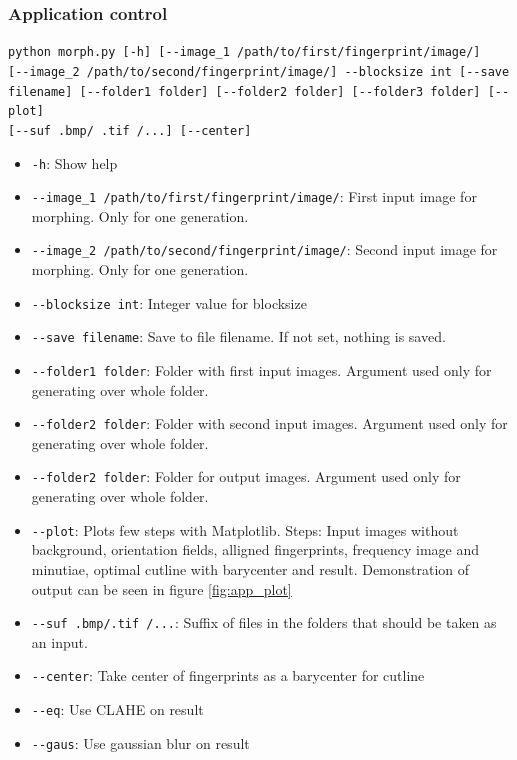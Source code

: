 \subsubsection{Application control}
\texttt{python morph.py [-h] [-{}-image\_1 /path/to/first/fingerprint/image/]} \\ \texttt{[-{}-image\_2 /path/to/second/fingerprint/image/] -{}-blocksize int [-{}-save \\ filename] [-{}-folder1 folder] [-{}-folder2 folder] [-{}-folder3 folder] [-{}-plot]} \\ \texttt{[-{}-suf .bmp/ .tif /...] [-{}-center]}

\begin{itemize}
    \item \texttt{-h}: Show help 
    \item \texttt{-{}-image\_1 /path/to/first/fingerprint/image/}: First input image for morphing. Only for one generation.
    \item \texttt{-{}-image\_2 /path/to/second/fingerprint/image/}: Second input image for morphing. Only for one generation.
    \item \texttt{-{}-blocksize int}: Integer value for blocksize
    \item \texttt{-{}-save filename}: Save to file filename. If not set, nothing is saved.
    \item \texttt{-{}-folder1 folder}: Folder with first input images. Argument used only for generating over whole folder.
    \item \texttt{-{}-folder2 folder}: Folder with second input images. Argument used only for generating over whole folder.
    \item \texttt{-{}-folder2 folder}: Folder for output images. Argument used only for generating over whole folder.
    \item \texttt{-{}-plot}: Plots few steps with Matplotlib. Steps: 
    Input images without background, orientation fields, alligned fingerprints, frequency image and minutiae, optimal cutline with barycenter and result. Demonstration of output can be seen in figure \ref{fig:app_plot}
	\item \texttt{-{}-suf .bmp/.tif /...}: Suffix of files in the folders that should be taken as an input.
	\item \texttt{-{}-center}: Take center of fingerprints as a barycenter for cutline
	\item \texttt{-{}-eq}: Use CLAHE on result
	\item \texttt{-{}-gaus}: Use gaussian blur on result
\end{itemize}

